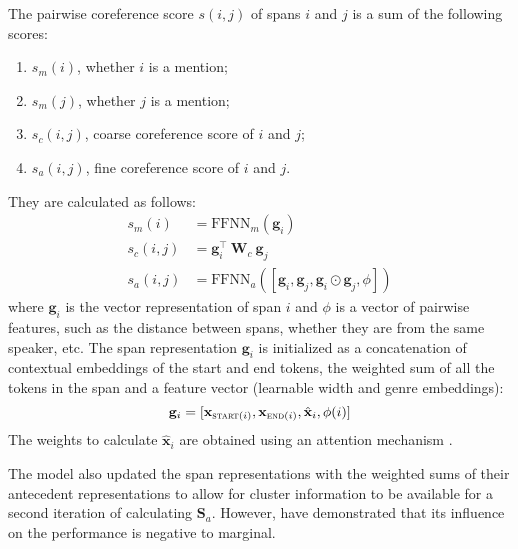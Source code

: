\documentclass[11pt]{article}
\begin{document}
The pairwise coreference score $s(i, j)$ of spans $i$ and $j$ is a sum of the following scores:
\begin{enumerate}
    \item $s_m(i)$, whether $i$ is a mention;
    \item $s_m(j)$, whether $j$ is a mention;
    \item $s_c(i, j)$, coarse coreference score of $i$ and $j$;
    \item $s_a(i, j)$, fine coreference score of $i$ and $j$.
\end{enumerate}
They are calculated as follows:
\begin{align}
    s_m(i) &= \text{FFNN}_m(\mathbf{g}_i)    \\
    s_c(i, j) &= \mathbf{g}_i^\intercal \ \mathbf{W}_c \ \mathbf{g}_j  \\
    s_a(i, j) &= \text{FFNN}_a([\mathbf{g}_i, \mathbf{g}_j, \mathbf{g}_i \odot \mathbf{g}_j, \phi])
\end{align}
where $\mathbf{g}_i$ is the vector representation of span $i$ and $\phi$ is a vector of pairwise features, such as the distance between spans, whether they are from the same speaker, etc. The span representation $\mathbf{g}_i$ is initialized as a concatenation of contextual embeddings of the start and end tokens, the weighted sum of all the tokens in the span and a feature vector (learnable width and genre embeddings):
\begin{equation}
    \mathbf{g}_i = [\mathbf{x}_{\textsc{start}(i)}, \mathbf{x}_{\textsc{end}(i)}, \hat{\mathbf{x}}_i, \phi(i)]
\end{equation}
The weights to calculate $\hat{\mathbf{x}}_i$ are obtained using an attention mechanism \citep{bahdanau2014neural}.

The model also updated the span representations with the weighted sums of their antecedent representations to allow for cluster information to be available for a second iteration of calculating $\mathbf{S}_a$. However, \citet{xu-choi-2020-revealing} have demonstrated that its influence on the performance is negative to marginal.
\end{document}
